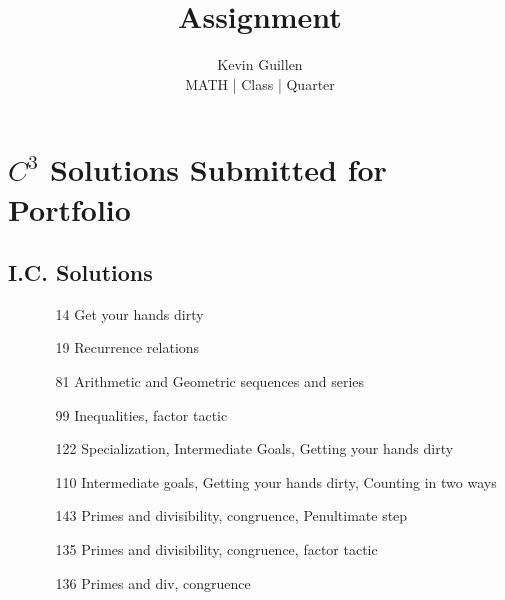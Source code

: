 \documentclass[11pt]{article}
\begin{document}
 
\title{Assignment}
\author{Kevin Guillen\\[0.5em]
MATH  | Class | Quarter}
\date{} 
\maketitle
\newpage

\tableofcontents
\newpage
\section{$C^{3}$ Solutions Submitted for Portfolio}
\subsection{I.C. Solutions}
\begin{itemize}
    \item[\text{Oct 4 Sub. }]  \begin{itemize}
        \item[14] Get your hands dirty
        \item[19] Recurrence relations
    \end{itemize}
    \item[\text{Nov 1 Sub. }] \begin{itemize}
        \item[81] Arithmetic and Geometric sequences and series
        \item[99] Inequalities, factor tactic
    \end{itemize}
    \item[\text{Nov 8 Sub. }]  \begin{itemize}
        \item[122] Specialization, Intermediate Goals, Getting your hands dirty
        \item[110] Intermediate goals, Getting your hands dirty, Counting in two ways
    \end{itemize}
    \item[\text{Nov 15 Sub. }] \begin{itemize}
        \item[143] Primes and divisibility, congruence, Penultimate step
    \end{itemize}
    \item[\text{Nov 19 ReSub. }] \begin{itemize}
        \item[135] Primes and divisibility, congruence, factor tactic
        \item[136] Primes and div, congruence

\end{itemize}
\end{itemize}
\end{document}
